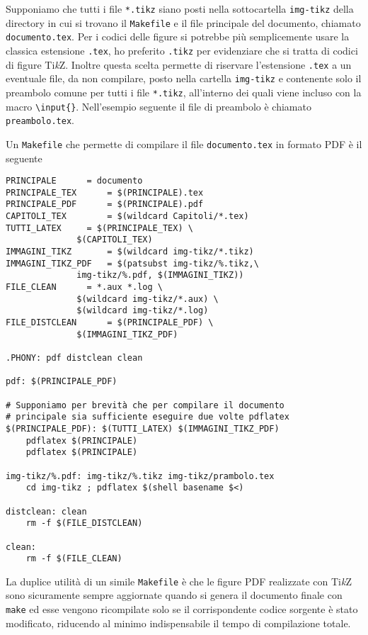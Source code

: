 Supponiamo che tutti i file \texttt{*.tikz} siano posti nella sottocartella
\texttt{img-tikz} della directory in cui si trovano il \texttt{Makefile} e il
file principale del documento, chiamato \texttt{documento.tex}. Per i codici
delle figure si potrebbe più semplicemente usare la classica estensione
\texttt{.tex}, ho preferito \texttt{.tikz} per evidenziare che si tratta di
codici di figure Ti\emph{k}Z.  Inoltre questa scelta permette di riservare
l'estensione \texttt{.tex} a un eventuale file, da non compilare, posto nella
cartella \texttt{img-tikz} e contenente solo il preambolo comune per tutti i
file \texttt{*.tikz}, all'interno dei quali viene incluso con la macro
\texttt{\textbackslash{}input\{\}}.  Nell'esempio seguente il file di preambolo
è chiamato \texttt{preambolo.tex}.

Un \texttt{Makefile} che permette di compilare il file \texttt{documento.tex} in
formato \textsc{PDF} è il seguente
\begin{lstlisting}
PRINCIPALE 		= documento
PRINCIPALE_TEX		= $(PRINCIPALE).tex
PRINCIPALE_PDF		= $(PRINCIPALE).pdf
CAPITOLI_TEX		= $(wildcard Capitoli/*.tex)
TUTTI_LATEX		= $(PRINCIPALE_TEX) \
			  $(CAPITOLI_TEX)
IMMAGINI_TIKZ		= $(wildcard img-tikz/*.tikz)
IMMAGINI_TIKZ_PDF	= $(patsubst img-tikz/%.tikz,\
			  img-tikz/%.pdf, $(IMMAGINI_TIKZ))
FILE_CLEAN		= *.aux *.log \
			  $(wildcard img-tikz/*.aux) \
			  $(wildcard img-tikz/*.log)
FILE_DISTCLEAN		= $(PRINCIPALE_PDF) \
			  $(IMMAGINI_TIKZ_PDF)

.PHONY: pdf distclean clean

pdf: $(PRINCIPALE_PDF)

# Supponiamo per brevità che per compilare il documento
# principale sia sufficiente eseguire due volte pdflatex
$(PRINCIPALE_PDF): $(TUTTI_LATEX) $(IMMAGINI_TIKZ_PDF)
	pdflatex $(PRINCIPALE)
	pdflatex $(PRINCIPALE)

img-tikz/%.pdf: img-tikz/%.tikz img-tikz/prambolo.tex
	cd img-tikz ; pdflatex $(shell basename $<)

distclean: clean
	rm -f $(FILE_DISTCLEAN)

clean:
	rm -f $(FILE_CLEAN)
\end{lstlisting}
La duplice utilità di un simile \texttt{Makefile} è che le figure \textsc{PDF}
realizzate con Ti\emph{k}Z sono sicuramente sempre aggiornate quando si genera
il documento finale con \texttt{make} ed esse vengono ricompilate solo se il
corrispondente codice sorgente è stato modificato, riducendo al minimo
indispensabile il tempo di compilazione totale.

